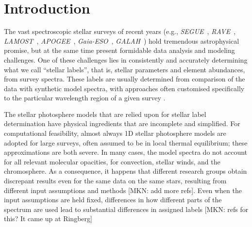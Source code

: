 \documentclass[12pt, preprint]{aastex}
\newcommand{\apogee}{\textsl{APOGEE}}
\newcommand{\galah}{\textsl{GALAH}}
\newcommand{\segue}{\textsl{SEGUE}}
\newcommand{\gaiaeso}{\textsl{Gaia-ESO}}
\newcommand{\rave}{\textsl{RAVE}}
\newcommand{\lamost}{\textsl{LAMOST}}
\begin{document}

\section{Introduction}\label{sec:Intro}

The vast spectroscopic stellar surveys of recent years (e.g., \segue\ \citep{Beers2006}, \rave\ \citep{Steinmetz2006}, \lamost\ \citep{Newberg2012}, \apogee\ \citep{Majewski2012}, \gaiaeso\ \citep{Gilmore2012}, \galah\ \citep{Freeman2012}) hold tremendous astrophysical promise, but at the same time present formidable data analysis and modeling challenges. 
One of these challenges lies in consistently and accurately determining what we call ``stellar labels'', that is, stellar parameters and element abundances, from survey spectra. 
These labels are usually determined from comparison of the data with synthetic model spectra, with approaches often 
customised specifically to the particular wavelength region of a given survey \citep[e.g.,][]{ Lee2006, Boeche2011, Liu2014, Meszaros2013, Sm2014}. 

The stellar photosphere models that are relied upon for stellar label determination have physical ingredients that are incomplete and simplified. 
For computational feasibility, almost always 1D stellar photosphere models are adopted for large surveys, often assumed to be in local thermal equilibrium; these approximations are both severe. 
In many cases, the model spectra do not account for all relevant  molecular opacities, for convection, stellar winds, and the chromosphere. 
As a consequence, it happens that different research groups obtain discrepant results even for the same data on the same stars, resulting from different input assumptions and methods \citep[e.g.,][]{Sm2014} [MKN: add more refs].
Even when the input assumptions are held fixed, differences in how different parts of the spectrum are used lead to substantial differences in assigned labels [MKN: refs for this? It came up at Ringberg]
\end{document}
